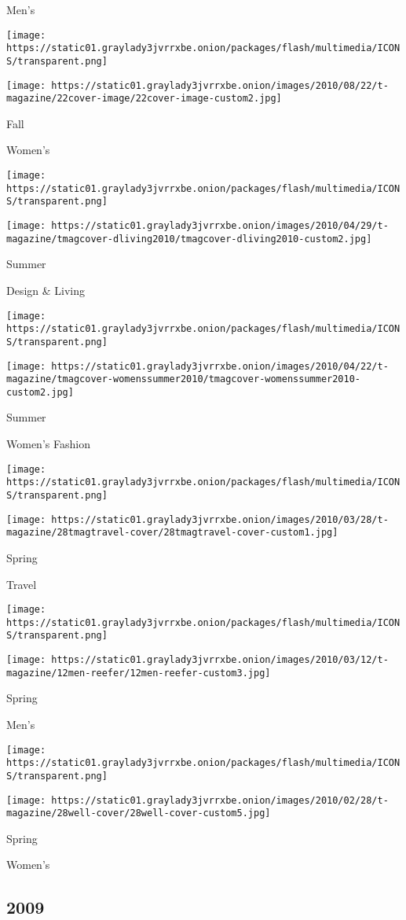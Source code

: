 Men's

\texttt{[image: https://static01.graylady3jvrrxbe.onion/packages/flash/multimedia/ICONS/transparent.png]}

\texttt{[image: https://static01.graylady3jvrrxbe.onion/images/2010/08/22/t-magazine/22cover-image/22cover-image-custom2.jpg]}

Fall

Women's

\texttt{[image: https://static01.graylady3jvrrxbe.onion/packages/flash/multimedia/ICONS/transparent.png]}

\texttt{[image: https://static01.graylady3jvrrxbe.onion/images/2010/04/29/t-magazine/tmagcover-dliving2010/tmagcover-dliving2010-custom2.jpg]}

Summer

Design \& Living

\texttt{[image: https://static01.graylady3jvrrxbe.onion/packages/flash/multimedia/ICONS/transparent.png]}

\texttt{[image: https://static01.graylady3jvrrxbe.onion/images/2010/04/22/t-magazine/tmagcover-womenssummer2010/tmagcover-womenssummer2010-custom2.jpg]}

Summer

Women's Fashion

\texttt{[image: https://static01.graylady3jvrrxbe.onion/packages/flash/multimedia/ICONS/transparent.png]}

\texttt{[image: https://static01.graylady3jvrrxbe.onion/images/2010/03/28/t-magazine/28tmagtravel-cover/28tmagtravel-cover-custom1.jpg]}

Spring

Travel

\texttt{[image: https://static01.graylady3jvrrxbe.onion/packages/flash/multimedia/ICONS/transparent.png]}

\texttt{[image: https://static01.graylady3jvrrxbe.onion/images/2010/03/12/t-magazine/12men-reefer/12men-reefer-custom3.jpg]}

Spring

Men's

\texttt{[image: https://static01.graylady3jvrrxbe.onion/packages/flash/multimedia/ICONS/transparent.png]}

\texttt{[image: https://static01.graylady3jvrrxbe.onion/images/2010/02/28/t-magazine/28well-cover/28well-cover-custom5.jpg]}

Spring

Women's

\hypertarget{2009}{%
\subsection{2009}\label{2009}}

